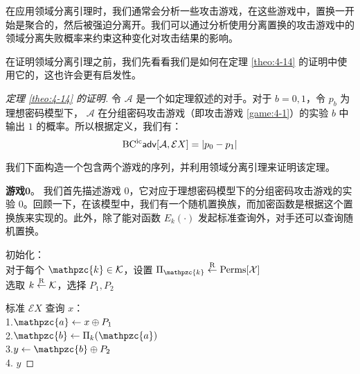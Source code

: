 在应用领域分离引理时，我们通常会分析一些攻击游戏，在这些游戏中，置换一开始是聚合的，然后被强迫分离开。我们可以通过分析使用分离置换的攻击游戏中的领域分离失败概率来约束这种变化对攻击结果的影响。

在证明领域分离引理之前，我们先看看我们是如何在定理 \ref{theo:4-14} 的证明中使用它的，这也许会更有启发性。

\begin{proof}[定理 \ref{theo:4-14} 的证明]
令 $\mathcal{A}$ 是一个如定理叙述的对手。对于 $b=0,1$，令 $p_b$ 为理想密码模型下， $\mathcal{A}$ 在分组密码攻击游戏（即攻击游戏 \ref{game:4-1}）的实验 $b$ 中输出 $1$ 的概率。所以根据定义，我们有：
\begin{equation}\label{eq:4-39}
{\rm BC^{ic}\mathsf{adv}}[\mathcal{A},\mathcal{E}X]=|p_0-p_1|
\end{equation}

我们下面构造一个包含两个游戏的序列，并利用领域分离引理来证明该定理。

\vspace{5pt}

\noindent\textbf{游戏$\mathbf{0}$}。
我们首先描述游戏 $0$，它对应于理想密码模型下的分组密码攻击游戏的实验 $0$。回顾一下，在该模型中，我们有一个随机置换族，而加密函数是根据这个置换族来实现的。此外，除了能对函数 $E_k(\cdot)$ 发起标准查询外，对手还可以查询随机置换。

\vspace{5pt}

\hspace*{5pt} 初始化：\\
\hspace*{50pt} 对于每个 $\mathpzc{k}\in\mathcal{K}$，设置 $\Pi_\mathpzc{k}\overset{\rm R}\leftarrow{\rm Perms}[\mathcal{X}]$\\
\hspace*{50pt} 选取 $k\overset{\rm R}\leftarrow\mathcal{K}$，选择 $P_1,P_2$

\vspace{5pt}

\hspace*{5pt} 标准 $\mathcal{E}X$ 查询 $x$：\\
\hspace*{26pt} 1.\quad\;\;$\mathpzc{a}\leftarrow x\oplus P_1$\\
\hspace*{26pt} 2.\quad\;\;$\mathpzc{b}\leftarrow\Pi_k(\mathpzc{a})$\\
\hspace*{26pt} 3.\quad\;\;$y\leftarrow\mathpzc{b}\oplus P_2$\\
\hspace*{26pt} 4.\quad\; $y$


\end{proof}
